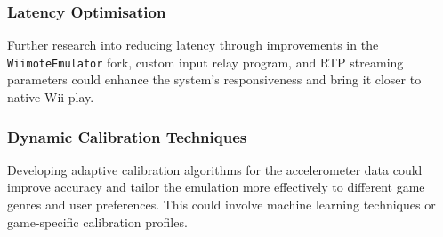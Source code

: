 \subsubsection{Latency Optimisation}
Further research into reducing latency through improvements in the \texttt{WiimoteEmulator} fork, custom input relay program, and RTP streaming parameters could enhance the system’s responsiveness and bring it closer to native Wii play.

\subsubsection{Dynamic Calibration Techniques}
Developing adaptive calibration algorithms for the accelerometer data could improve accuracy and tailor the emulation more effectively to different game genres and user preferences. This could involve machine learning techniques or game-specific calibration profiles.
